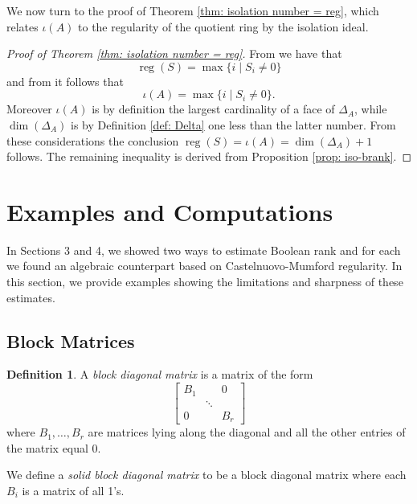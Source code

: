\documentclass[11pt,letterpaper, reqno]{amsart}
\theoremstyle{definition}
\newtheorem{definition}[theorem]{Definition}
\theoremstyle{remark}
\DeclareMathOperator{\reg}{reg}
\numberwithin{equation}{section}
\begin{document}
We now turn to the proof of Theorem \ref{thm: isolation number = reg}, which relates $\iota(A)$ to the regularity of the quotient ring by the isolation ideal.

\begin{proof}[Proof of Theorem \ref{thm: isolation number = reg}]
 
From  we have that
\[\reg(S)=\max\{i\mid S_i\neq 0\}\]
and from  it follows that 
\[
\iota(A)=\max\{i\mid S_i\neq 0\}.
\]
Moreover $\iota(A)$ is by definition the largest cardinality of a face of $\Delta_A$, while $\dim(\Delta_A)$ is by Definition \ref{def: Delta} one less than the latter number.
From these considerations the conclusion $\reg(S)=\iota(A)=\dim(\Delta_A)+1$ follows. The remaining inequality is derived from Proposition \ref{prop: iso-brank}.
\end{proof}
\section{Examples and Computations}\label{s: computations}

In Sections 3 and 4, we showed two ways to estimate Boolean rank and for each we found an algebraic counterpart based on Castelnuovo-Mumford regularity. In this section, we provide examples showing the limitations and sharpness of these estimates.
\subsection{Block Matrices}
\begin{definition}
A \textit{block diagonal matrix} is a matrix of the form 
\[
\begin{bmatrix}
    B_1 & & 0\\
    & \ddots &\\
    0& & B_r
\end{bmatrix}
\]
where $B_1, \ldots, B_r$ are matrices lying along the diagonal and all the other entries of the matrix equal 0.

We define a \textit{solid block diagonal matrix} to be a block diagonal matrix where each $B_i$ is a matrix of all 1's.
\end{definition}
\end{document}
